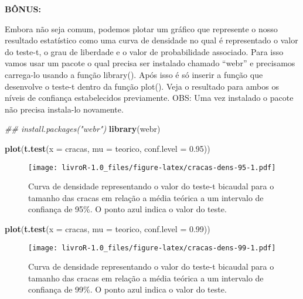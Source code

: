 \documentclass[]{book}
\newenvironment{Shaded}{\begin{snugshade}}{\end{snugshade}}
\newcommand{\CommentTok}[1]{\textcolor[rgb]{0.56,0.35,0.01}{\textit{#1}}}
\newcommand{\DataTypeTok}[1]{\textcolor[rgb]{0.13,0.29,0.53}{#1}}
\newcommand{\FloatTok}[1]{\textcolor[rgb]{0.00,0.00,0.81}{#1}}
\newcommand{\KeywordTok}[1]{\textcolor[rgb]{0.13,0.29,0.53}{\textbf{#1}}}
\newcommand{\NormalTok}[1]{#1}
\begin{document}
\textbf{BÔNUS:}

Embora não seja comum, podemos plotar um gráfico que represente o nosso resultado estatístico como uma curva de densidade no qual é representado o valor do teste-t, o grau de liberdade e o valor de probabilidade associado. Para isso vamos usar um pacote o qual precisa ser instalado chamado ``webr'' e precisamos carrega-lo usando a função library(). Após isso é só inserir a função que desenvolve o teste-t dentro da função plot(). Veja o resultado para ambos os níveis de confiança estabelecidos previamente. OBS: Uma vez instalado o pacote não precisa instala-lo novamente.

\begin{Shaded}
\begin{Highlighting}[]
\CommentTok{## install.packages("webr")}
\KeywordTok{library}\NormalTok{(webr)}
\end{Highlighting}
\end{Shaded}

\begin{Shaded}
\begin{Highlighting}[]
\KeywordTok{plot}\NormalTok{(}\KeywordTok{t.test}\NormalTok{(}\DataTypeTok{x =}\NormalTok{ cracas, }\DataTypeTok{mu =}\NormalTok{ teorico, }\DataTypeTok{conf.level =} \FloatTok{0.95}\NormalTok{))}
\end{Highlighting}
\end{Shaded}

\begin{figure}
\centering
\texttt{[image: livroR-1.0\_files/figure-latex/cracas-dens-95-1.pdf]}
\caption{\label{fig:cracas-dens-95}Curva de densidade representando o valor do teste-t bicaudal para o tamanho das cracas em relação a média teórica a um intervalo de confiança de 95\%. O ponto azul indica o valor do teste.}
\end{figure}

\begin{Shaded}
\begin{Highlighting}[]
\KeywordTok{plot}\NormalTok{(}\KeywordTok{t.test}\NormalTok{(}\DataTypeTok{x =}\NormalTok{ cracas, }\DataTypeTok{mu =}\NormalTok{ teorico, }\DataTypeTok{conf.level =} \FloatTok{0.99}\NormalTok{))}
\end{Highlighting}
\end{Shaded}

\begin{figure}
\centering
\texttt{[image: livroR-1.0\_files/figure-latex/cracas-dens-99-1.pdf]}
\caption{\label{fig:cracas-dens-99}Curva de densidade representando o valor do teste-t bicaudal para o tamanho das cracas em relação a média teórica a um intervalo de confiança de 99\%. O ponto azul indica o valor do teste.}
\end{figure}
\end{document}
